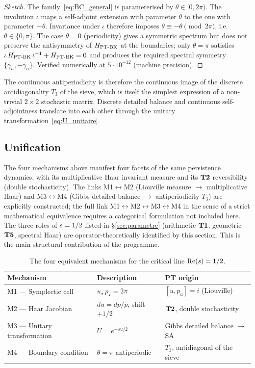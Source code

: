 \begin{proof}[Sketch]
The family~\eqref{eq:BC_general} is parameterised by
$\theta \in [0, 2\pi)$. The involution $\iota$ maps a self-adjoint
extension with parameter $\theta$ to the one with parameter $-\theta$.
Invariance under $\iota$ therefore imposes $\theta \equiv -\theta \pmod{2\pi}$,
i.e.\ $\theta \in \{0, \pi\}$. The case $\theta = 0$ (periodicity) gives a
symmetric spectrum but does not preserve the antisymmetry of $H_{\mathrm{PT\text{-}BK}}$ at
the boundaries; only $\theta = \pi$ satisfies
$\iota\,H_{\mathrm{PT\text{-}BK}}\,\iota^{-1} + H_{\mathrm{PT\text{-}BK}} = 0$ and produces the required
spectral symmetry $\{\gamma_n, -\gamma_n\}$. Verified numerically at
$5 \cdot 10^{-12}$ (machine precision).
\end{proof}

The continuous antiperiodicity is therefore the continuous image of
the discrete antidiagonality $T_3$ of the sieve, which is itself
the simplest expression of a non-trivial $2 \times 2$ stochastic matrix.
Discrete detailed balance and continuous self-adjointness translate
into each other through the unitary transformation~\eqref{eq:U_unitaire}.

\subsection{Unification}
\label{sec:localisation_unification}

The four mechanisms above manifest four facets of the same
persistence dynamics, with its multiplicative Haar invariant measure
and its $\textbf{T2}$ reversibility (double stochasticity). The links
M1$\leftrightarrow$M2 (Liouville measure $\to$ multiplicative Haar) and
M3$\leftrightarrow$M4 (Gibbs detailed balance $\to$ antiperiodicity
$T_3$) are explicitly constructed; the full link
M1$\leftrightarrow$M2$\leftrightarrow$M3$\leftrightarrow$M4 in the sense
of a strict mathematical equivalence requires a categorical
formulation not included here. The three roles of $s = 1/2$ listed
in \S\ref{sec:parametre} (arithmetic $\textbf{T1}$, geometric $\textbf{T5}$,
spectral Haar) are operator-theoretically identified by this section.
This is the main structural contribution of the programme.

\begin{table}[ht]
\centering
\begin{tabular}{@{}lll@{}}
\toprule
\textbf{Mechanism} & \textbf{Description} & \textbf{PT origin}\\
\midrule
M1 --- Symplectic cell & $u_\star\,p_\star = 2\pi$ & $[u, p_u] = i$ (Liouville)\\
M2 --- Haar Jacobian & $du = dp/p$, shift $+1/2$ & $\textbf{T2}$, double stochasticity\\
M3 --- Unitary transformation & $U = e^{-su/2}$ & Gibbs detailed balance $\to$ SA\\
M4 --- Boundary condition & $\theta = \pi$ antiperiodic & $T_3$, antidiagonal of the sieve\\
\bottomrule
\end{tabular}
\caption{The four equivalent mechanisms for the critical line
$\operatorname{Re}(s) = 1/2$.}
\label{tab:quatre_mecanismes}
\end{table}

